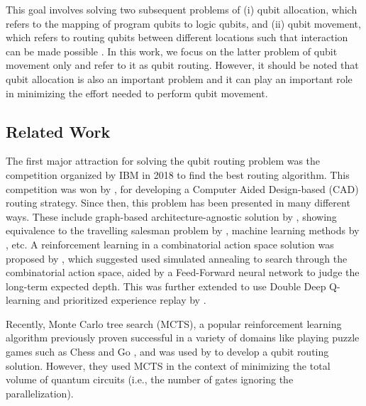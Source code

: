 \documentclass[%
 reprint,
amsmath,amssymb,showkeys,
pra,
]{revtex4-2}
\begin{document}
This goal involves solving two subsequent problems of (i) qubit allocation, which refers to the mapping of program qubits to logic qubits, and (ii) qubit movement, which refers to routing qubits between different locations such that interaction can be made possible \citep{utk_qubit_noise}. In this work, we focus on the latter problem of qubit movement only and refer to it as qubit routing. However, it should be  noted that qubit allocation is also an important problem and it can play an important role in minimizing the effort needed to perform qubit movement.



\subsection{\label{sec:intro-related}Related Work}

The first major attraction for solving the qubit routing problem was the competition organized by IBM in 2018 to find the best routing algorithm. This competition was won by \citet{zulehner2018mapping}, for developing a Computer Aided Design-based (CAD) routing strategy. Since then, this problem has been presented in many different ways. These include graph-based architecture-agnostic solution by \citet{qroute_tket}, showing equivalence to the travelling salesman problem by \citet{paler_torus}, machine learning methods by \citet{paler_ml}, etc. A reinforcement learning in a combinatorial action space solution was proposed by \citet{qroute_dqn1}, which suggested used simulated annealing to search through the combinatorial action space, aided by a Feed-Forward neural network to judge the long-term expected depth. This was further extended to use Double Deep Q-learning and prioritized experience replay by \citet{qroute_dqn2}. 

Recently, Monte Carlo tree search (MCTS), a popular reinforcement learning algorithm \citep{mcts_survey} previously proven successful in a variety of domains like playing puzzle games such as Chess and Go \citep{mcts_alphago}, and was used by \citet{qroute_mcts} to develop a qubit routing solution. However, they used MCTS in the context of minimizing the total volume of quantum circuits (i.e., the number of gates ignoring the parallelization).

\end{document}
